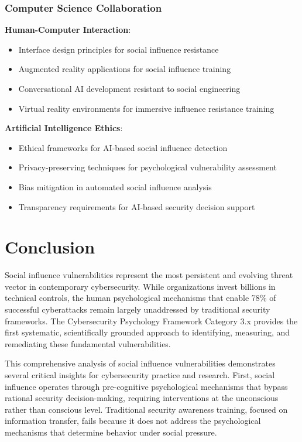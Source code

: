 \documentclass[11pt,a4paper]{article}
\begin{document}
\subsubsection{Computer Science Collaboration}

\textbf{Human-Computer Interaction}:
\begin{itemize}
\item Interface design principles for social influence resistance
\item Augmented reality applications for social influence training
\item Conversational AI development resistant to social engineering
\item Virtual reality environments for immersive influence resistance training
\end{itemize}

\textbf{Artificial Intelligence Ethics}:
\begin{itemize}
\item Ethical frameworks for AI-based social influence detection
\item Privacy-preserving techniques for psychological vulnerability assessment
\item Bias mitigation in automated social influence analysis
\item Transparency requirements for AI-based security decision support
\end{itemize}

\section{Conclusion}

Social influence vulnerabilities represent the most persistent and evolving threat vector in contemporary cybersecurity. While organizations invest billions in technical controls, the human psychological mechanisms that enable 78\% of successful cyberattacks remain largely unaddressed by traditional security frameworks. The Cybersecurity Psychology Framework Category 3.x provides the first systematic, scientifically grounded approach to identifying, measuring, and remediating these fundamental vulnerabilities.

This comprehensive analysis of social influence vulnerabilities demonstrates several critical insights for cybersecurity practice and research. First, social influence operates through pre-cognitive psychological mechanisms that bypass rational security decision-making, requiring interventions at the unconscious rather than conscious level. Traditional security awareness training, focused on information transfer, fails because it does not address the psychological mechanisms that determine behavior under social pressure.
\end{document}
